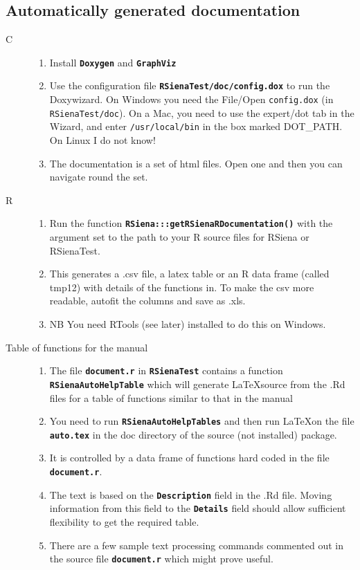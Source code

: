 \documentclass[12pt, a4paper]{article}
\renewcommand{\=}{\,=\,}
\newcommand{\+}{\,+\,}
\newcommand{\sfn}[1]{\textbf{\texttt{#1}}}
\begin{document}
\subsection{Automatically generated documentation}
\begin{description}
\item[C]
\begin{enumerate}
\item Install \sfn{Doxygen} and \sfn{GraphViz}
\item Use the configuration file \sfn{RSienaTest/doc/config.dox} to run the
  Doxywizard. On Windows you need the File/Open \texttt{config.dox} (in
  \texttt{RSienaTest/doc}).  On a Mac, you need to use the expert/dot tab in the
  Wizard, and enter \texttt{/usr/local/bin} in the box marked DOT\_PATH. On
  Linux I do not know!
\item The documentation is a set of html files. Open one and then you can
  navigate round the set.
\end{enumerate}
\item[R]
\begin{enumerate}
\item Run the function \sfn{RSiena:::getRSienaRDocumentation()} with the
  argument set to the path to your R source files for RSiena or RSienaTest.
\item This generates a .csv file, a latex table or an R data frame (called
  tmp12) with details of the functions in. To make the csv more readable,
  autofit the columns and save as .xls.
\item NB You need RTools (see later) installed to do this on Windows.
\end{enumerate}
\item[Table of functions for the manual]
\begin{enumerate}
\item The file \sfn{document.r} in \sfn{RSienaTest} contains a function
  \sfn{RSienaAutoHelpTable} which will generate \LaTeX source  from the .Rd
  files for a table of functions similar to that in the manual
\item You need to run \sfn{RSienaAutoHelpTables} and then run \LaTeX on the file
  \sfn{auto.tex} in the doc directory of the source (not installed) package.
\item It is controlled by a data frame of functions hard coded in the file
  \sfn{document.r}.
\item The text is based on the \sfn{Description} field in the .Rd file. Moving
  information from this field to the \sfn{Details} field should allow sufficient
  flexibility to get the required table.
\item There are a few sample text processing commands commented out in the
  source file \sfn{document.r} which might prove useful.
\end{enumerate}
\end{description}
\end{document}
